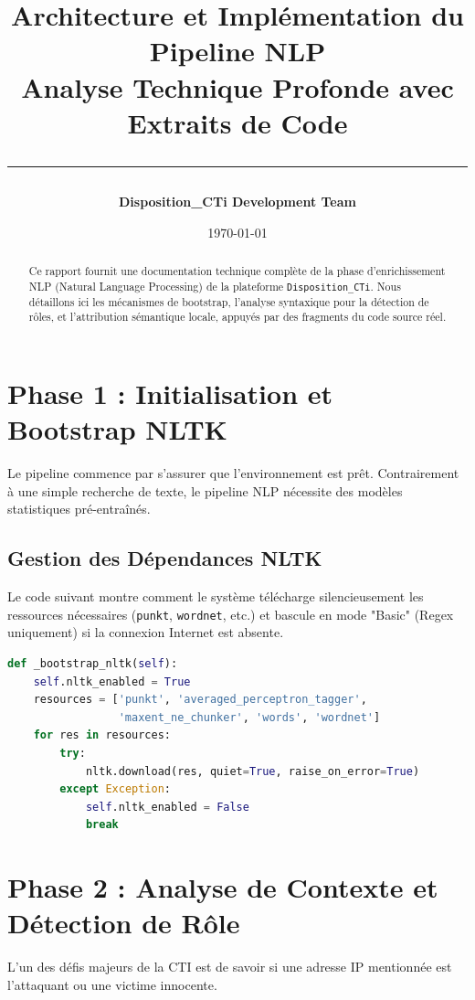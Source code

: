 \documentclass[12pt,a4paper]{article}
\title{
    \vspace{-2cm}
    \textbf{\huge Architecture et Implémentation du Pipeline NLP}\\
    \large Analyse Technique Profonde avec Extraits de Code\\
    \vspace{0.5cm}
    \rule{\linewidth}{0.5mm}
}
\author{\textbf{Disposition\_CTi Development Team}}
\date{\today}
\begin{document}
\maketitle

\begin{abstract}
Ce rapport fournit une documentation technique complète de la phase d'enrichissement NLP (Natural Language Processing) de la plateforme \texttt{Disposition\_CTi}. Nous détaillons ici les mécanismes de bootstrap, l'analyse syntaxique pour la détection de rôles, et l'attribution sémantique locale, appuyés par des fragments du code source réel.
\end{abstract}

\tableofcontents
\newpage

\section{Phase 1 : Initialisation et Bootstrap NLTK}
Le pipeline commence par s'assurer que l'environnement est prêt. Contrairement à une simple recherche de texte, le pipeline NLP nécessite des modèles statistiques pré-entraînés.

\subsection{Gestion des Dépendances NLTK}
Le code suivant montre comment le système télécharge silencieusement les ressources nécessaires (\texttt{punkt}, \texttt{wordnet}, etc.) et bascule en mode "Basic" (Regex uniquement) si la connexion Internet est absente.

\begin{lstlisting}[language=Python, caption=Initialisation et Bootstrap]
def _bootstrap_nltk(self):
    self.nltk_enabled = True
    resources = ['punkt', 'averaged_perceptron_tagger', 
                 'maxent_ne_chunker', 'words', 'wordnet']
    for res in resources:
        try:
            nltk.download(res, quiet=True, raise_on_error=True)
        except Exception:
            self.nltk_enabled = False
            break
\end{lstlisting}

\section{Phase 2 : Analyse de Contexte et Détection de Rôle}
L'un des défis majeurs de la CTI est de savoir si une adresse IP mentionnée est l'attaquant ou une victime innocente. 
\end{document}
